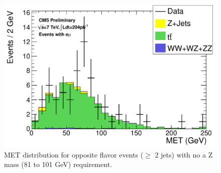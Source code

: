 \begin{figure}[hbt]
  \begin{center}
	\includegraphics[width=0.8\linewidth]{plots/hdilmet_em_allj.pdf}
	\caption{
	  \label{fig:emudilmet}\protect 
	  MET distribution for opposite flavor events ($\ge$ 2 jets)
	  with no a Z mass (81 to 101 GeV) requirement.
	}
  \end{center}
\end{figure}

